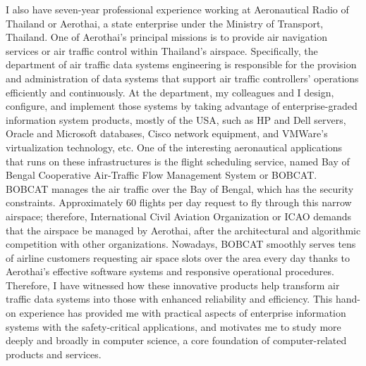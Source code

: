 \documentclass[a4paper,10pt]{report}
\begin{document}
\vspace{0.2cm}
I also have seven-year professional experience working at Aeronautical Radio of Thailand or Aerothai, a state enterprise under the Ministry of Transport, Thailand. One of Aerothai's principal missions is to provide air navigation services or air traffic control within Thailand's airspace. Specifically, the department of air traffic data systems engineering is responsible for the provision and administration of data systems that support air traffic controllers' operations efficiently and continuously. At the department, my colleagues and I design, configure, and implement those systems by taking advantage of enterprise-graded information system products, mostly of the USA, such as HP and Dell servers, Oracle and Microsoft databases, Cisco network equipment, and VMWare's virtualization technology, etc. One of the interesting aeronautical applications that runs on these infrastructures is the flight scheduling service, named Bay of Bengal Cooperative Air-Traffic Flow Management System or BOBCAT. BOBCAT manages the air traffic over the Bay of Bengal, which has the security constraints. Approximately 60 flights per day request to fly through this narrow airspace; therefore, International Civil Aviation Organization or ICAO demands that the airspace be managed by Aerothai, after the architectural and algorithmic competition with other organizations. Nowadays, BOBCAT smoothly serves tens of airline customers requesting air space slots over the area every day thanks to Aerothai's effective software systems and responsive operational procedures.  Therefore, I have witnessed how these innovative products help transform air traffic data systems into those with enhanced reliability and efficiency. This hand-on experience has provided me with practical aspects of enterprise information systems with the safety-critical applications, and motivates me to study more deeply and broadly in computer science, a core foundation of computer-related products and services. 
\end{document}
